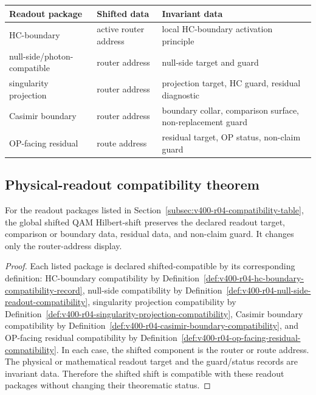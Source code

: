 \begin{center}
\scriptsize
\setlength{\tabcolsep}{2pt}
\begin{tabular}{@{}p{}P{0.30\textwidth}P{0.34\textwidth}@{}}
\toprule
Readout package & Shifted data & Invariant data\\
\midrule
HC-boundary & active router address & local HC-boundary activation principle\\
null-side/photon-compatible & router address & null-side target and guard\\
singularity projection & router address & projection target, HC guard, residual diagnostic\\
Casimir boundary & router address & boundary collar, comparison surface, non-replacement guard\\
OP-facing residual & route address & residual target, OP status, non-claim guard\\
\bottomrule
\end{tabular}
\end{center}

\subsection{Physical-readout compatibility theorem}
\label{subsec:v400-r04-physical-readout-compatibility-theorem}

\begin{theorem}
\label{thm:v400-r04-physical-readout-compatibility}
For the readout packages listed in Section~\ref{subsec:v400-r04-compatibility-table},
the global shifted QAM Hilbert-shift preserves the declared readout target,
comparison or boundary data, residual data, and non-claim guard. It changes
only the router-address display.
\end{theorem}

\begin{proof}
Each listed package is declared shifted-compatible by its corresponding definition:
HC-boundary compatibility by
Definition~\ref{def:v400-r04-hc-boundary-compatibility-record}, null-side
compatibility by Definition~\ref{def:v400-r04-null-side-readout-compatibility},
singularity projection compatibility by
Definition~\ref{def:v400-r04-singularity-projection-compatibility}, Casimir
boundary compatibility by
Definition~\ref{def:v400-r04-casimir-boundary-compatibility}, and OP-facing
residual compatibility by
Definition~\ref{def:v400-r04-op-facing-residual-compatibility}. In each case,
the shifted component is the router or route address. The physical or
mathematical readout target and the guard/status records are invariant data.
Therefore the shifted shift is compatible with these readout packages without
changing their theorematic status.
\end{proof}

